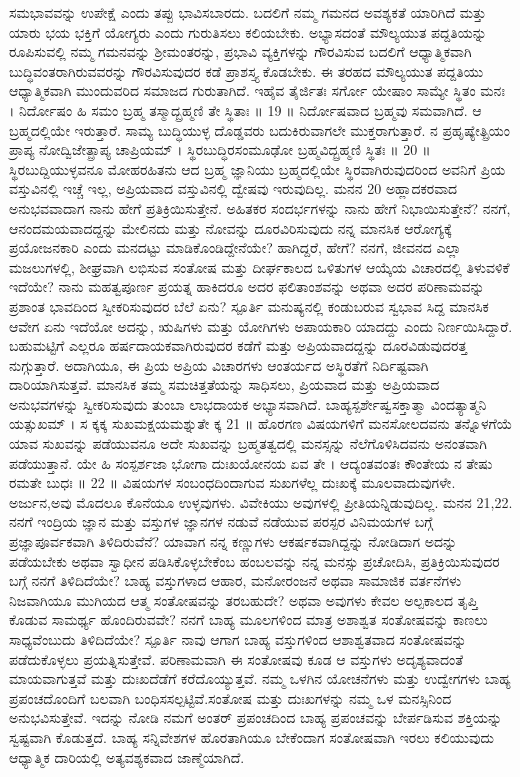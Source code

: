  ಸಮಭಾವವನ್ನು ಉಪೇಕ್ಷೆ ಎಂದು ತಪ್ಪು ಭಾವಿಸಬಾರದು. ಬದಲಿಗೆ ನಮ್ಮ ಗಮನದ ಅವಶ್ಯಕತೆ ಯಾರಿಗಿದೆ ಮತ್ತು ಯಾರು ಭಯ ಭಕ್ತಿಗೆ ಯೋಗ್ಯರು ಎಂದು ಗುರುತಿಸಲು ಕಲಿಯಬೇಕು. ಅಭ್ಯಾಸದಂತೆ ಮೌಲ್ಯಯುತ ಪದ್ದತಿಯನ್ನು ರೂಪಿಸುವಲ್ಲಿ ನಮ್ಮ ಗಮನವನ್ನು ಶ್ರೀಮಂತರನ್ನು, ಪ್ರಭಾವಿ ವ್ಯಕ್ತಿಗಳನ್ನು ಗೌರವಿಸುವ ಬದಲಿಗೆ ಆಧ್ಯಾತ್ಮಿಕವಾಗಿ ಬುದ್ಧಿವಂತರಾಗಿರುವವರನ್ನು ಗೌರವಿಸುವುದರ ಕಡೆ ಪ್ರಾಶಸ್ತ್ಯ ಕೊಡಬೇಕು. ಈ ತರಹದ ಮೌಲ್ಯಯುತ ಪದ್ದತಿಯು ಆಧ್ಯಾತ್ಮಿಕವಾಗಿ ಮುಂದುವರಿದ ಸಮಾಜದ ಗುರುತಾಗಿದೆ.
ಇಹೈವ ತೈರ್ಜಿತಃ ಸರ್ಗೋ ಯೇಷಾಂ ಸಾಮ್ಯೇ ಸ್ಥಿತಂ ಮನಃ ।
ನಿರ್ದೋಷಂ ಹಿ ಸಮಂ ಬ್ರಹ್ಮ ತಸ್ಮಾದ್ಬ್ರಹ್ಮಣಿ ತೇ ಸ್ಥಿತಾಃ ॥ 19 ॥
 ನಿರ್ದೋಷವಾದ ಬ್ರಹ್ಮವು ಸಮವಾಗಿದೆ. ಆ ಬ್ರಹ್ಮದಲ್ಲಿಯೇ ಇರುತ್ತಾರೆ. ಸಾಮ್ಯ ಬುದ್ಧಿಯುಳ್ಳ ದೊಡ್ಡವರು ಬದುಕಿರುವಾಗಲೇ ಮುಕ್ತರಾಗುತ್ತಾರೆ.
ನ ಪ್ರಹೃಷ್ಯೇತ್ಪ್ರಿಯಂ ಪ್ರಾಪ್ಯ ನೋದ್ವಿಜೇತ್ಪ್ರಾಪ್ಯ ಚಾಪ್ರಿಯಮ್ ।
ಸ್ಥಿರಬುದ್ಧಿರಸಂಮೂಢೋ ಬ್ರಹ್ಮವಿದ್ಬ್ರಹ್ಮಣಿ ಸ್ಥಿತಃ ॥ 20 ॥
 ಸ್ಥಿರಬುದ್ದಿಯುಳ್ಳವನೂ ಮೋಹರಹಿತನು ಆದ ಬ್ರಹ್ಮ ಜ್ಞಾನಿಯು ಬ್ರಹ್ಮದಲ್ಲಿಯೇ ಸ್ಥಿರವಾಗಿರುವುದರಿಂದ ಅವನಿಗೆ ಪ್ರಿಯ ವಸ್ತುವಿನಲ್ಲಿ ಇಚ್ಚೆ ಇಲ್ಲ, ಅಪ್ರಿಯವಾದ ವಸ್ತುವಿನಲ್ಲಿ ದ್ವೇಷವು ಇರುವುದಿಲ್ಲ.
ಮನನ 20 
ಅಹ್ಲಾದಕರವಾದ ಅನುಭವವಾದಾಗ ನಾನು ಹೇಗೆ  ಪ್ರತಿಕ್ರಿಯಿಸುತ್ತೇನೆ.  ಅಹಿತಕರ ಸಂದರ್ಭಗಳನ್ನು  ನಾನು ಹೇಗೆ ನಿಭಾಯಿಸುತ್ತೇನೆ? ನನಗೆ, ಆನಂದಮಯವಾದದ್ದನ್ನು  ಮೇಲಿನದು ಮತ್ತು ನೋವನ್ನು ದೂರವಿರಿಸುವುದು ನನ್ನ ಮಾನಸಿಕ ಆರೋಗ್ಯಕ್ಕೆ ಪ್ರಯೋಜನಕಾರಿ ಎಂದು ಮನದಟ್ಟು ಮಾಡಿಕೊಂಡಿದ್ದೇನೆಯೇ? ಹಾಗಿದ್ದರೆ, ಹೇಗೆ?
 ನನಗೆ, ಜೀವನದ ಎಲ್ಲಾ ಮಜಲುಗಳಲ್ಲಿ, ಶೀಘ್ರವಾಗಿ ಲಭಿಸುವ ಸಂತೋಷ ಮತ್ತು ದೀರ್ಘಕಾಲದ ಒಳಿತುಗಳ ಆಯ್ಕೆಯ ವಿಚಾರದಲ್ಲಿ ತಿಳುವಳಿಕೆ ಇದೆಯೇ? ನಾನು ಮಹತ್ವಪೂರ್ಣ ಪ್ರಯತ್ನ ಹಾಕಿದರೂ ಅದರ ಫಲಿತಾಂಶವನ್ನು ಅಥವಾ ಅದರ ಪರಿಣಾಮವನ್ನು ಪ್ರಶಾಂತ ಭಾವದಿಂದ ಸ್ವೀಕರಿಸುವುದರ ಬೆಲೆ ಏನು?
 ಸ್ಪೂರ್ತಿ 
 ಮನುಷ್ಯನಲ್ಲಿ ಕಂಡುಬರುವ ಸ್ವಭಾವ ಸಿದ್ದ ಮಾನಸಿಕ ಆವೇಗ ಏನು ಇದೆಯೋ ಅದನ್ನು, ಋಷಿಗಳು ಮತ್ತು ಯೋಗಿಗಳು ಅಪಾಯಕಾರಿ ಯಾದದ್ದು ಎಂದು  ನಿರ್ಣಯಿಸಿದ್ದಾರೆ.  ಬಹುಮಟ್ಟಿಗೆ ಎಲ್ಲರೂ ಹರ್ಷದಾಯಕವಾಗಿರುವುದರ ಕಡೆಗೆ ಮತ್ತು ಅಪ್ರಿಯವಾದದ್ದನ್ನು ದೂರವಿಡುವುದರತ್ತ ನುಗ್ಗುತ್ತಾರೆ. ಅದಾಗಿಯೂ,  ಈ ಪ್ರಿಯ ಅಪ್ರಿಯ  ವಿಚಾರಗಳು ಆಂತರ್ಯದ ಅಸ್ಥಿರತೆಗೆ ನಿರ್ದಿಷ್ಟವಾಗಿ ದಾರಿಯಾಗಿಸುತ್ತವೆ. ಮಾನಸಿಕ ತಮ್ಮ ಸಮಚಿತ್ತತೆಯನ್ನು  ಸಾಧಿಸಲು, ಪ್ರಿಯವಾದ ಮತ್ತು ಅಪ್ರಿಯವಾದ ಅನುಭವಗಳನ್ನು ಸ್ವೀಕರಿಸುವುದು ತುಂಬಾ ಲಾಭದಾಯಕ ಅಭ್ಯಾಸವಾಗಿದೆ.
ಬಾಹ್ಯಸ್ಪರ್ಶೇಷ್ವಸಕ್ತಾತ್ಮಾ ವಿಂದತ್ಯಾತ್ಮನಿ ಯತ್ಸುಖಮ್ ।
ಸ ಕ್ಕಕ್ಕ ಸುಖಮಕ್ಷಯಮಶ್ನುತೇ ಕ್ಕ 21 ॥
 ಹೊರಗಣ ವಿಷಯಗಳಿಗೆ ಮನಸೋಲದವನು ತನ್ನೊಳಗೆಯೆ ಯಾವ ಸುಖವನ್ನು ಪಡೆಯುವನೂ ಅದೇ ಸುಖವನ್ನು ಬ್ರಹ್ಮತತ್ವದಲ್ಲಿ ಮನಸ್ಸನ್ನು ನೆಲೆಗೊಳಿಸಿದವನು ಅನಂತವಾಗಿ ಪಡೆಯುತ್ತಾನೆ.
ಯೇ ಹಿ ಸಂಸ್ಪರ್ಶಜಾ ಭೋಗಾ ದುಃಖಯೋನಯ ಏವ ತೇ ।
ಆದ್ಯಂತವಂತಃ ಕೌಂತೇಯ ನ ತೇಷು ರಮತೇ ಬುಧಃ ॥ 22 ॥
 ವಿಷಯಗಳ ಸಂಬಂಧದಿಂದಾಗುವ ಸುಖಗಳೆಲ್ಲ ದುಃಖಕ್ಕೆ ಮೂಲವಾದುವುಗಳೇ. ಅರ್ಜುನ,ಅವು ಮೊದಲೂ ಕೊನೆಯೂ ಉಳ್ಳವುಗಳು. ವಿವೇಕಿಯು ಅವುಗಳಲ್ಲಿ ಪ್ರೀತಿಯನ್ನಿಡುವುದಿಲ್ಲ.
ಮನನ 21,22.
 ನನಗೆ ಇಂದ್ರಿಯ ಜ್ಞಾನ  ಮತ್ತು ವಸ್ತುಗಳ ಜ್ಞಾನಗಳ ನಡುವೆ ನಡೆಯುವ ಪರಸ್ಪರ ವಿನಿಮಯಗಳ ಬಗ್ಗೆ ಪ್ರಜ್ಞಾಪೂರ್ವಕವಾಗಿ  ತಿಳಿದಿರುವೆನೆ? ಯಾವಾಗ ನನ್ನ ಕಣ್ಣುಗಳು ಆಕರ್ಷಕವಾಗಿದ್ದನ್ನು ನೋಡಿದಾಗ ಅದನ್ನು ಪಡೆಯಬೇಕು ಅಥವಾ ಸ್ವಾಧೀನ ಪಡಿಸಿಕೊಳ್ಳಬೇಕೆಂಬ ಹಂಬಲವನ್ನು ನನ್ನ ಮನಸ್ಸು ಪ್ರಚೋದಿಸಿ, ಪ್ರತಿಕ್ರಿಯಿಸುವುದರ ಬಗ್ಗೆ ನನಗೆ ತಿಳಿದಿದೆಯೇ? ಬಾಹ್ಯ ವಸ್ತುಗಳಾದ ಆಹಾರ, ಮನೋರಂಜನೆ ಅಥವಾ ಸಾಮಾಜಿಕ ವರ್ತನೆಗಳು ನಿಜವಾಗಿಯೂ ಮುಗಿಯದ ಆತ್ಮ ಸಂತೋಷವನ್ನು ತರಬಹುದೇ? ಅಥವಾ ಅವುಗಳು ಕೇವಲ ಅಲ್ಪಕಾಲದ ತೃಪ್ತಿ ಕೊಡುವ ಸಾಮರ್ಥ್ಯ ಹೊಂದಿರುವವೇ? ನನಗೆ ಬಾಹ್ಯ ಮೂಲಗಳಿಂದ ಮಾತ್ರ ಅಶಾಶ್ವತ ಸಂತೋಷವನ್ನು ಕಾಣಲು ಸಾಧ್ಯವೆಂಬುದು ತಿಳಿದಿದೆಯೇ?
 ಸ್ಪೂರ್ತಿ 
 ನಾವು ಆಗಾಗ ಬಾಹ್ಯ ವಸ್ತುಗಳಿಂದ ಆಶಾಶ್ವತವಾದ ಸಂತೋಷವನ್ನು ಪಡೆದುಕೊಳ್ಳಲು ಪ್ರಯತ್ನಿಸುತ್ತೇವೆ. ಪರಿಣಾಮವಾಗಿ ಈ ಸಂತೋಷವು ಕೂಡ ಆ ವಸ್ತುಗಳು ಅದೃಶ್ಯವಾದಂತೆ ಮಾಯವಾಗುತ್ತವೆ ಮತ್ತು ದುಃಖದೆಡೆಗೆ ಕರೆದೊಯ್ಯುತ್ತವೆ. ನಮ್ಮ ಒಳಗಿನ ಯೋಚನೆಗಳು ಮತ್ತು ಉದ್ವೇಗಗಳು ಬಾಹ್ಯ  ಪ್ರಪಂಚದೊಂದಿಗೆ ಬಲವಾಗಿ ಬಂಧಿಸಸಲ್ಪಟ್ಟಿವೆ.ಸಂತೋಷ ಮತ್ತು ದುಃಖಗಳನ್ನು ನಮ್ಮ ಒಳ ಮನಸ್ಸಿನಿಂದ ಅನುಭವಿಸುತ್ತೇವೆ. ಇದನ್ನು ನೋಡಿ ನಮಗೆ ಅಂತರ್ ಪ್ರಪಂಚದಿಂದ ಬಾಹ್ಯ ಪ್ರಪಂಚವನ್ನು ಬೇರ್ಪಡಿಸುವ ಶಕ್ತಿಯನ್ನು ಸ್ವಷ್ಟವಾಗಿ ಕೊಡುತ್ತದೆ.  ಬಾಹ್ಯ ಸನ್ನಿವೇಶಗಳ ಹೊರತಾಗಿಯೂ ಬೇಕೆಂದಾಗ ಸಂತೋಷವಾಗಿ ಇರಲು ಕಲಿಯುವುದು ಆಧ್ಯಾತ್ಮಿಕ ದಾರಿಯಲ್ಲಿ ಅತ್ಯವಶ್ಯಕವಾದ ಜಾಣ್ಮೆಯಾಗಿದೆ.

